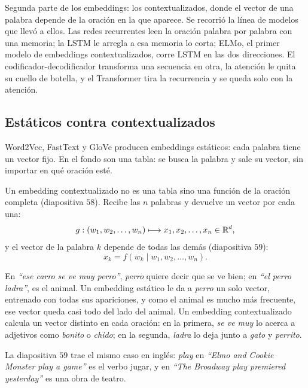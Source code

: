 \documentclass[11pt,letterpaper]{article}
\begin{document}


\begin{quick_sum}
    Segunda parte de los embeddings: los contextualizados, donde el
    vector de una palabra depende de la oración en la que aparece. Se
    recorrió la línea de modelos que llevó a ellos. Las redes
    recurrentes leen la oración palabra por palabra con una memoria; la
    LSTM le arregla a esa memoria lo corta; ELMo, el primer modelo de
    embeddings contextualizados, corre LSTM en las dos direcciones. El
    codificador-decodificador transforma una secuencia en otra, la
    atención le quita su cuello de botella, y el Transformer tira la
    recurrencia y se queda solo con la atención.
\end{quick_sum}

\subsection*{Estáticos contra contextualizados}

Word2Vec, FastText y GloVe producen embeddings estáticos: cada palabra
tiene un vector fijo. En el fondo son una tabla: se busca la palabra y
sale su vector, sin importar en qué oración esté.

Un embedding contextualizado no es una tabla sino una función de la
oración completa (diapositiva $58$). Recibe las $n$ palabras y
devuelve un vector por cada una:
\[
    g : (w_1, w_2, \dots, w_n) \longmapsto x_1, x_2, \dots, x_n
    \in \mathbb{R}^d ,
\]
y el vector de la palabra $k$ depende de todas las demás
(diapositiva $59$):
\[
    x_k = f(w_k \mid w_1, w_2, \dots, w_n) .
\]

\begin{ejemplo}
    En \textit{``ese carro se ve muy perro''}, \textit{perro} quiere
    decir que se ve bien; en \textit{``el perro ladra''}, es el animal.
    Un embedding estático le da a \textit{perro} un solo vector,
    entrenado con todas sus apariciones, y como el animal es mucho más
    frecuente, ese vector queda casi todo del lado del animal. Un
    embedding contextualizado calcula un vector distinto en cada
    oración: en la primera, \textit{se ve muy} lo acerca a adjetivos
    como \textit{bonito} o \textit{chido}; en la segunda,
    \textit{ladra} lo deja junto a \textit{gato} y \textit{perrito}.

    La diapositiva $59$ trae el mismo caso en inglés:
    \textit{play} en \textit{``Elmo and Cookie Monster play a game''}
    es el verbo jugar, y en \textit{``The Broadway play premiered
    yesterday''} es una obra de teatro.
\end{ejemplo}
\end{document}
